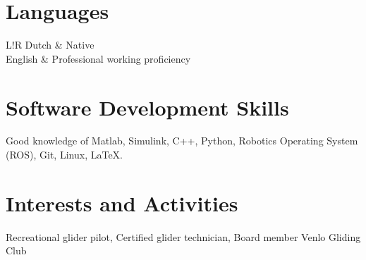 \documentclass[a4paper,10pt]{article}
\newcommand\VRule{\color{lightgray}\vrule width 0.5pt}
\begin{document}
\section*{Languages}
\begin{tabular}{L!{\VRule}R}
Dutch       &   Native\\
English     &   Professional working proficiency\\
\end{tabular}

\section*{Software Development Skills}
Good knowledge of Matlab, Simulink, C++, Python, Robotics Operating System (ROS), Git,  Linux, LaTeX.

\section*{Interests and Activities}
Recreational glider pilot, Certified glider technician, Board member Venlo Gliding Club
\end{document}
